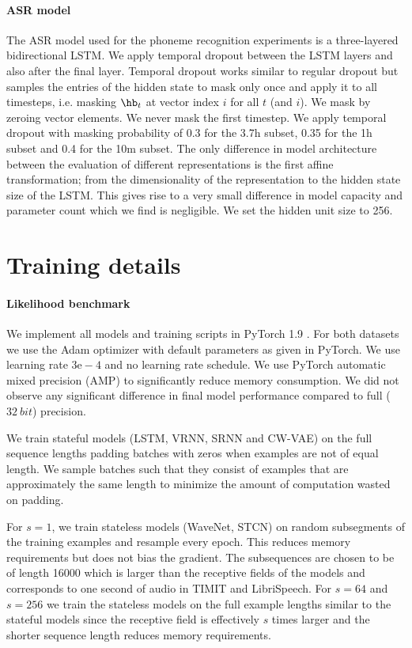 {\paragraph{ASR model}
The ASR model used for the phoneme recognition experiments is a three-layered bidirectional LSTM. We apply temporal dropout between the LSTM layers and also after the final layer. Temporal dropout works similar to regular dropout but samples the entries of the hidden state to mask only once and apply it to all timesteps, i.e. masking $\hb_{t}$ at vector index $i$ for all $t$ (and $i$). 
We mask by zeroing vector elements. We never mask the first timestep. 
We apply temporal dropout with masking probability of 0.3 for the 3.7h subset, 0.35 for the 1h subset and 0.4 for the 10m subset. 
The only difference in model architecture between the evaluation of different representations is the first affine transformation; from the dimensionality of the representation to the hidden state size of the LSTM. This gives rise to a very small difference in model capacity and parameter count which we find is negligible. We set the hidden unit size to 256. 


\section{Training details}\label{app: training details}
\paragraph{Likelihood benchmark}
We implement all models and training scripts in PyTorch 1.9 \cite{paszke_automatic_2017}.
For both datasets we use the Adam optimizer \cite{kingma_adam_2015} with default parameters as given in PyTorch. We use learning rate $3\text{e}-4$ and no learning rate schedule.
We use PyTorch automatic mixed precision (AMP) to significantly reduce memory consumption. We did not observe any significant difference in final model performance compared to full ($\SI{32}{bit}$) precision.

We train stateful models (LSTM, VRNN, SRNN and CW-VAE) on the full sequence lengths padding batches with zeros when examples are not of equal length. We sample batches such that they consist of examples that are approximately the same length to minimize the amount of computation wasted on padding.

For $s=1$, we train stateless models (WaveNet, STCN) on random subsegments of the training examples and resample every epoch. This reduces memory requirements but does not bias the gradient. The subsequences are chosen to be of length 16000 which is larger than the receptive fields of the models and corresponds to one second of audio in TIMIT and LibriSpeech. 
For $s=64$ and $s=256$ we train the stateless models on the full example lengths similar to the stateful models since the receptive field is effectively $s$ times larger and the shorter sequence length reduces memory requirements.

}
